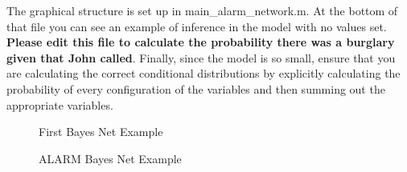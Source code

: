 \documentclass[12pt]{article}
\begin{document}
{	 The graphical structure is set up in main\_alarm\_network.m.  At the bottom of that file you can see an example of inference in the model with no values set. {\bf Please edit this file to calculate the probability there was a burglary given that John called}. Finally, since the model is so small, ensure that you are calculating the correct conditional distributions by explicitly calculating the probability of every configuration of the variables and then summing out the appropriate variables.\\
	 \begin{figure}
		\begin{center}
			\caption{First Bayes Net Example}
			\label{bnexample}
		\end{center} 
	\end{figure} 
}


	\begin{figure}
		\begin{center}
			\caption{ALARM Bayes Net Example}
			\label{ALARM}
		\end{center} 
	\end{figure} 
\end{document}
